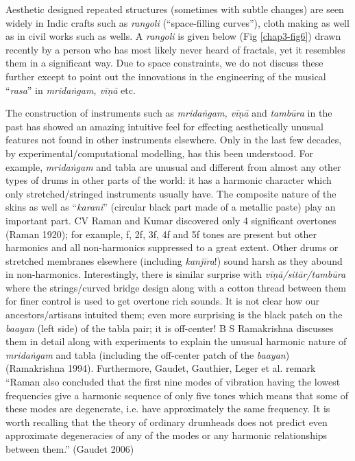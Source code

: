 Aesthetic designed repeated structures (sometimes with subtle changes) are seen widely in Indic crafts such as \textsl{rangoli} (“space-filling curves”), cloth making as well as in civil works such as wells. A \textsl{rangoli} is given below (Fig \ref{chap3-fig6}) drawn recently by a person who has most likely never heard of fractals, yet it resembles them in a significant way. Due to space constraints, we do not discuss these further except to point out the innovations in the engineering of the musical “\textsl{rasa}” in \textsl{mridaṅgam, vīṇā} etc.

The construction of instruments such as \textsl{mridaṅgam, vīṇā} and \textsl{tambūra} in the past has showed an amazing intuitive feel for effecting aesthetically unusual features not found in other instruments elsewhere. Only in the last few decades, by experimental/computational modelling, has this been understood. For example, \textsl{mridaṅgam} and tabla are unusual and different from almost any other types of drums in other parts of the world: it has a harmonic character which only stretched/\-stringed instruments usually have. The composite nature of the skins as well as “\textsl{karani}” (circular black part made of a metallic paste) play an important part.  CV Raman and Kumar discovered only 4 significant overtones (Raman 1920); for example, f, 2f, 3f, 4f and 5f tones are present but other harmonics and all non-harmonics suppressed to a great extent. Other drums or stretched membranes elsewhere (including \textsl{kanjīra}!) sound harsh as they abound in non-harmonics. Interestingly, there is similar surprise with \textsl{vīṇā/sitār/tambūra} where the strings/curved bridge design along with a cotton thread between them for finer control is used to get overtone rich sounds. It is not clear how our ancestors/artisans intuited them; even more surprising is the black patch on the \textsl{baayan} (left side) of the tabla pair; it is off-center! B S Ramakrishna discusses them in detail along with experiments to explain the unusual harmonic nature of \textsl{mridaṅgam} and tabla (including the off-center patch of the \textsl{baayan}) (Ramakrishna 1994). Furthermore, Gaudet, Gauthier, Leger et al. remark “Raman also concluded that the first nine modes of vibration having the lowest frequencies give a harmonic sequence of only five tones which means that some of these modes are degenerate, i.e. have approximately the same frequency. It is worth recalling that the theory of ordinary drumheads does not predict even approximate degeneracies of any of the modes or any harmonic relationships between them.” (Gaudet 2006)
